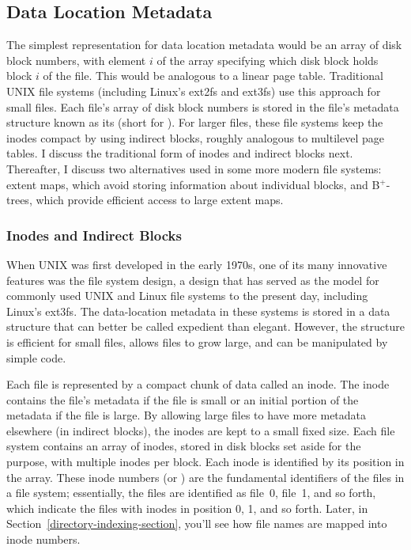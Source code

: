 \subsection{Data Location Metadata}\label{data-location-metadata-section}

The simplest representation for data location metadata would be an
array of disk block numbers, with element $i$ of the array specifying
which disk block holds block $i$ of the file.  This would be analogous
to a linear page table.  Traditional UNIX file systems (including
Linux's ext2fs and ext3fs) use this approach for small files.  Each file's
array of disk block numbers is stored in the file's metadata structure
known as its  (short for
).  For larger files, these file systems keep
the inodes compact by using indirect blocks, roughly
analogous to multilevel page tables.  I discuss the traditional form
of inodes and indirect blocks next.  Thereafter, I discuss two
alternatives used in some more modern file systems: extent maps, which
avoid storing information about individual blocks, and B${}^+$-trees, which
provide efficient access to large extent maps.

\subsubsection{Inodes and Indirect Blocks}

When UNIX was first developed in the early 1970s, one of its many
innovative features was the file system design, a design that has served as the
model for commonly used UNIX and Linux file systems to the present
day, including Linux's ext3fs.  The data-location metadata in these
systems is stored in a data structure that can better be called
expedient than elegant.  However, the structure is efficient for small files,
allows files to grow large, and can be manipulated by simple code.

Each file is represented by a compact chunk of data called an inode.
The inode contains the file's metadata if the file is small or an
initial portion of the metadata if the file is large.  By allowing
large files to have more metadata elsewhere (in indirect blocks), the
inodes are kept to a small fixed size.  Each file system contains an
array of inodes, stored in disk blocks set aside for the purpose,
with multiple inodes per block.  Each inode is identified by its position
in the array.  These inode numbers (or ) are the
fundamental identifiers of the files in a file system; essentially, the
files are identified as
file~0, file~1, and so forth, which indicate the files with inodes in position 0,
1, and so forth.  Later, in Section~\ref{directory-indexing-section}, you'll see
how file names are mapped into inode numbers.


